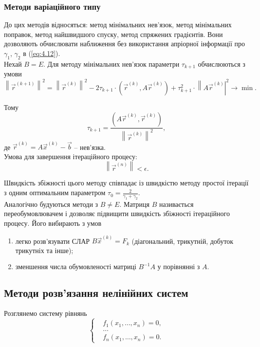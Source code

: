 \subsubsection{Методи варіаційного типу}

До цих методів відносяться: метод мінімальних нев’язок, метод мінімальних поправок, метод найшвидшого спуску, метод спряжених градієнтів. Вони дозволяють обчислювати наближення без використання апріорної інформації про $\gamma_1$, $\gamma_2$ в (\ref{eq:4.12}). \\

Нехай $B = E$. Для методу мінімальних нев’язок параметри $\tau_{k+1}$ обчислюються з умови 
\[ \left\|\vec r^{(k+1)}\right\|^2 = \left\|\vec r^{(k)}\right\|^2 - 2\tau_{k+1}\cdot\left(\vec r^{(k)}, A\vec r^{(k)}\right) + \tau_{k+1}^2 \cdot\left\|A\vec r^{(k)}\right|^2 \to \min. \]

Тому \[ \tau_{k+1} = \dfrac{\left(A\vec r^{(k)}, \vec r^{(k)}\right) }{\left\|\vec r^{(k)}\right\|^2},\] 
де $\vec r^{(k)} = A \vec x^{(k)} - \vec b$ -- нев'язка. \\

Умова для завершення ітераційного процесу: \[ \left\|\vec r^{(n)}\right\| < \epsilon.\]

Швидкість збіжності цього методу співпадає із швидкістю методу простої ітерації з одним оптимальним параметром $\tau_0 = \frac{2}{\gamma_1+\gamma_2}$. \\

Аналогічно будуються методи з $B \ne E$. Матриця $B$ називається переобумовлювачем і дозволяє підвищити швидкість збіжності ітераційного процесу. Його вибирають з умов 
\begin{enumerate}
	\item легко розв’язувати СЛАР $B \vec x^{(k)} = F_k$ (діагональний, трикутній, добуток трикутніх та інше); 
	\item зменшення числа обумовленості матриці $B^{-1}A$ у порівнянні з $A$.
\end{enumerate}

\subsection{Методи розв’язання нелінійних систем}

Розглянемо систему рівнянь
\[ \left\{ \begin{aligned} & f_1(x_1, \ldots, x_n) = 0, \\ & \ldots \\ & f_n(x_1,\ldots,x_n) = 0. \end{aligned} \right. \]

